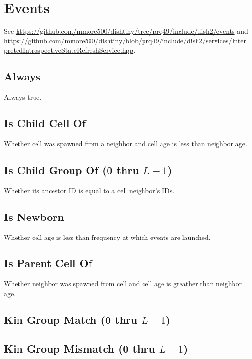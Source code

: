 \section{Events}

See \url{https://github.com/mmore500/dishtiny/tree/prq49/include/dish2/events} and \url{https://github.com/mmore500/dishtiny/blob/prq49/include/dish2/services/InterpretedIntrospectiveStateRefreshService.hpp}.

\subsection{Always}

Always true.

\subsection{Is Child Cell Of}

Whether cell was spawned from a neighbor and cell age is less than neighbor age.

\subsection{Is Child Group Of (0 thru $L-1$)}

Whether its ancestor ID is equal to a cell neighbor's IDs.

\subsection{Is Newborn}

Whether cell age is less than frequency at which events are launched.

\subsection{Is Parent Cell Of}

Whether neighbor was spawned from cell and cell age is greather than neighbor age.

\subsection{Kin Group Match (0 thru $L-1$)}

\subsection{Kin Group Mismatch (0 thru $L-1$)}

